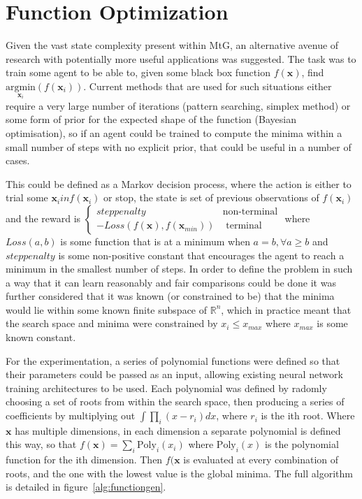 \section{Function Optimization}
Given the vast state complexity present within MtG, an alternative avenue of research with potentially more useful applications was suggested. The task was to train some agent to be able to, given some black box function $f(\boldsymbol{x})$, find $\underset{\boldsymbol{x}_i}{\text{argmin}} (f(\boldsymbol{x}_i))$. Current methods that are used for such situations either require a very large number of iterations (pattern searching, simplex method) or some form of prior for the expected shape of the function (Bayesian optimisation), so if an agent could be trained to compute the minima within a small number of steps with no explicit prior, that could be useful in a number of cases.

This could be defined as  a Markov decision process, where the action is either to trial some $\boldsymbol{x}_i in f(\boldsymbol{x}_i)$ or stop, the state is set of previous observations of $f(\boldsymbol{x}_i)$ and the reward is $\begin{cases}
 step penalty&  \text{non-terminal} \\
-Loss(f(\boldsymbol{x}), f(\boldsymbol{x}_{min})) & \text{ terminal}
\end{cases} $ where $Loss(a,b)$ is some function that is at a minimum when $a = b, \forall a \geq b$ and $step penalty$ is some non-positive constant that encourages the agent to reach a minimum in the smallest number of steps. 
In order to define the problem in such a way that it can learn reasonably and fair comparisons could be done it was further considered that it was known (or constrained to be) that the minima would lie within some known finite subspace of $\mathbb{R}^n$, which in practice meant that the search space and minima were constrained by $x_i \leq x_{max}$ where $x_{max}$ is some known constant.

For the experimentation, a series of polynomial functions were defined so that their parameters could be passed as an input, allowing existing neural network training architectures to be used. Each polynomial was defined by radomly choosing a set of roots from within the search space, then producing a series of coefficients by multiplying out
$\int \prod_i (x - r_i) dx$, where $r_i$ is the ith root. Where $\boldsymbol{x}$ has multiple dimensions, in each dimension a separate polynomial is defined this way, so that $f(\boldsymbol{x})  = \sum_i \text{Poly}_i(x_i)$ where $\text{Poly}_i(x)$ is the polynomial function for the ith dimension. Then $f(\boldsymbol{x}$ is evaluated at every combination of roots, and the one with the lowest value is the global minima. The full algorithm is detailed in figure~\ref{alg:functiongen}.

